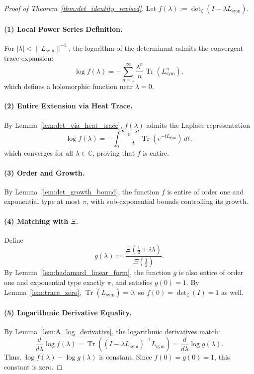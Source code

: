 \begin{proof}[Proof of Theorem~\ref{thm:det_identity_revised}]
Let \( f(\lambda) := \det\nolimits_\zeta(I - \lambda L_{\mathrm{sym}}) \).

\paragraph{(1) Local Power Series Definition.}
For \( |\lambda| < \|L_{\mathrm{sym}}\|^{-1} \), the logarithm of the determinant admits the convergent trace expansion:
\[
\log f(\lambda) = -\sum_{n=1}^\infty \frac{\lambda^n}{n} \operatorname{Tr}(L_{\mathrm{sym}}^n),
\]
which defines a holomorphic function near \( \lambda = 0 \).

\paragraph{(2) Entire Extension via Heat Trace.}
By Lemma~\ref{lem:det_via_heat_trace}, \( f(\lambda) \) admits the Laplace representation
\[
\log f(\lambda) = -\int_0^\infty \frac{e^{-\lambda t}}{t} \operatorname{Tr}(e^{-tL_{\mathrm{sym}}})\, dt,
\]
which converges for all \( \lambda \in \mathbb{C} \), proving that \( f \) is entire.

\paragraph{(3) Order and Growth.}
By Lemma~\ref{lem:det_growth_bound}, the function \( f \) is entire of order one and exponential type at most \( \pi \), with sub-exponential bounds controlling its growth.

\paragraph{(4) Matching with \( \Xi \).}
Define
\[
g(\lambda) := \frac{\Xi\left( \tfrac{1}{2} + i\lambda \right)}{\Xi\left( \tfrac{1}{2} \right)}.
\]
By Lemma~\ref{lem:hadamard_linear_form}, the function \( g \) is also entire of order one and exponential type exactly \( \pi \), and satisfies \( g(0) = 1 \). By Lemma~\ref{lem:trace_zero}, \( \operatorname{Tr}(L_{\mathrm{sym}}) = 0 \), so \( f(0) = \det\nolimits_\zeta(I) = 1 \) as well.

\paragraph{(5) Logarithmic Derivative Equality.}
By Lemma~\ref{lem:A_log_derivative}, the logarithmic derivatives match:
\[
\frac{d}{d\lambda} \log f(\lambda)
= \operatorname{Tr}\left( (I - \lambda L_{\mathrm{sym}})^{-1} L_{\mathrm{sym}} \right)
= \frac{d}{d\lambda} \log g(\lambda).
\]
Thus, \( \log f(\lambda) - \log g(\lambda) \) is constant. Since \( f(0) = g(0) = 1 \), this constant is zero.


\end{proof}
